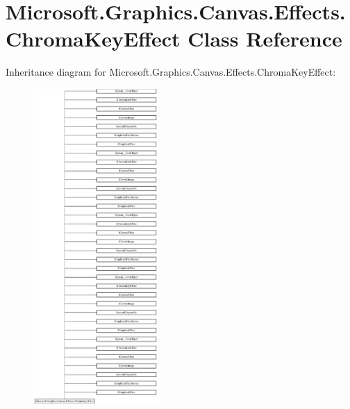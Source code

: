 \hypertarget{class_microsoft_1_1_graphics_1_1_canvas_1_1_effects_1_1_chroma_key_effect}{}\section{Microsoft.\+Graphics.\+Canvas.\+Effects.\+Chroma\+Key\+Effect Class Reference}
\label{class_microsoft_1_1_graphics_1_1_canvas_1_1_effects_1_1_chroma_key_effect}
Inheritance diagram for Microsoft.\+Graphics.\+Canvas.\+Effects.\+Chroma\+Key\+Effect\+:\begin{figure}[H]
\begin{center}
\leavevmode
\includegraphics[height=12.000000cm]{class_microsoft_1_1_graphics_1_1_canvas_1_1_effects_1_1_chroma_key_effect}
\end{center}
\end{figure}
